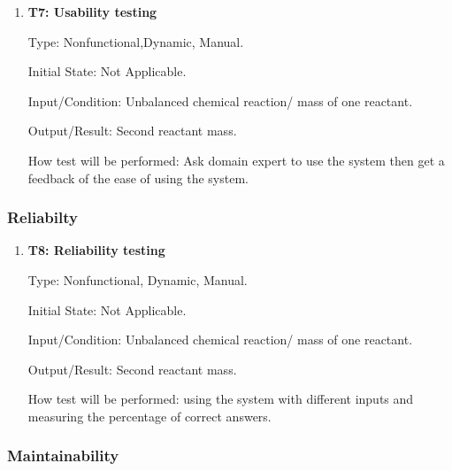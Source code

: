 \documentclass[12pt, titlepage]{article}
\begin{document}
\begin{enumerate}

\item{\bf T7: Usability testing\\}

Type: Nonfunctional,Dynamic, Manual.
					
Initial State: Not Applicable.
					
Input/Condition: Unbalanced chemical reaction/ mass of one reactant.
					
Output/Result: Second reactant mass.
					
How test will be performed: Ask domain expert to use the system then get a
feedback of the ease of using the system. 
					
\end{enumerate}

\subsubsection{Reliabilty }

\begin{enumerate}

\item{\bf T8: Reliability testing\\}

Type: Nonfunctional, Dynamic, Manual.
					
Initial State: Not Applicable.
					
Input/Condition: Unbalanced chemical reaction/ mass of one reactant.
					
Output/Result: Second reactant mass.
					
How test will be performed: using the system with different inputs and measuring
the percentage of correct answers. 

\end{enumerate}

\subsubsection{Maintainability}
\end{document}
